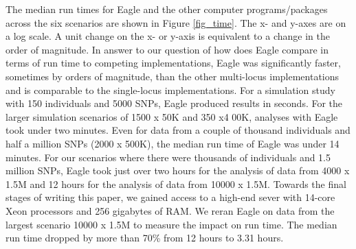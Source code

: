 \documentclass{article}
\begin{document}
The median run times for Eagle and the other computer programs/packages across the six scenarios are shown in Figure \ref{fig_time}. 
The x- and y-axes are on a log scale.  A unit change on the x- or y-axis is equivalent to a change in the order of magnitude.  
In answer to our question of how does Eagle compare in terms of run time to competing implementations, 
Eagle was significantly faster, sometimes by orders of magnitude,  than the other multi-locus
 implementations and is comparable to the single-locus implementations. For a simulation study with 150 individuals and 
 5000 SNPs, Eagle produced results in seconds.  For the larger simulation scenarios of 1500 x  50K and 350 x4 00K, 
 analyses with Eagle took under two minutes. Even for data from a couple of thousand individuals and half a million 
 SNPs (2000 x 500K), the median run time of Eagle was under 14 minutes. For our scenarios where there 
 were thousands of individuals and 1.5 million SNPs, Eagle took just over two hours for the analysis of data from 
 4000 x 1.5M and  12 hours for the analysis of data from 10000 x 1.5M. 
 Towards the final stages of writing this paper, 
 we gained access to a high-end sever with 14-core Xeon processors and 256 gigabytes of RAM. We reran Eagle on data from the largest
  scenario 10000 x 1.5M to measure the impact on run time. The median run time dropped by more than 70\% 
  from 12 hours to 3.31 hours. 
 
\end{document}
